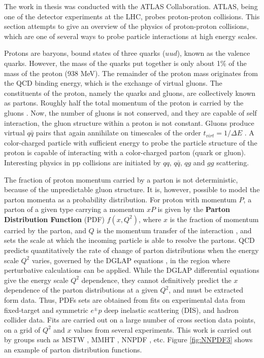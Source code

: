 \documentclass[11pt,a4paper,openright,twoside]{report}
\begin{document}
The work in thesis was conducted with the ATLAS Collaboration. ATLAS, being one of the detector experiments at the LHC, probes proton-proton collisions. This section attempts to give an overview of the physics of proton-proton collisions, which are one of several ways to probe particle interactions at high energy scales.

Protons are baryons, bound states of three quarks ($uud$), known as the valence quarks. However, the mass of the quarks put together is only about 1\% of the mass of the proton (938 MeV). The remainder of the proton mass originates from the QCD binding energy, which is the exchange of virtual gluons. The constituents of the proton, namely the quarks and gluons, are collectively known as partons. Roughly half the total momentum of the proton is carried by the gluons \cite{quarks_and_leptons}. Now, the number of gluons is not conserved, and they are capable of self interaction, the gluon structure within a proton is not constant. Gluons produce virtual $q\bar{q}$ pairs that again annihilate on timescales of the order $t_{virt}=1/\Delta E$ \cite{collider_physics}. A color-charged particle with sufficient energy to probe the particle structure of the proton is capable of interacting with a color-charged parton (quark or gluon). Interesting physics in pp collisions are initiated by $qq$, $q\bar{q}$, $qg$ and $gg$ scattering.

The fraction of proton momentum carried by a parton is not deterministic, because of the unpredictable gluon structure. It is, however, possible to model the parton momenta as a probability distribution. For proton with momentum $P$, a parton  of a given type carrying a momentum $xP$ is given by the \textbf{Parton Distribution Function} (PDF) $f(x,Q^2)$, where $x$ is the fraction of momentum carried by the parton, and $Q$ is the momentum transfer of the interaction \cite{collider_physics}, and sets the scale at which the incoming particle is able to resolve the partons. QCD predicts quantitatively the rate of change of parton distributions when the energy scale $Q^2$ varies, governed by the DGLAP equations \cite{DGLAP}, in the region where perturbative calculations can be applied. While the DGLAP differential equations give the energy scale $Q^2$ dependence, they cannot definitively predict the $x$ dependence of the parton distributions at a given $Q^2$, and must be extracted form data. Thus, PDFs sets are obtained from fits on experimental data from fixed-target and symmetric $e^\pm p$ deep inelastic scattering (DIS), and hadron collider data. Fits are carried out on a large number of cross section data points, on a grid of $Q^2$ and $x$ values from several experiments. This work is carried out by groups such as  MSTW \cite{MSTW, MSTW2, MSTW3}, MMHT \cite{MMHT14}, NNPDF \cite{NNPDF}, etc. Figure \ref{fig:NNPDF3} shows an example of parton distribution functions.
\end{document}
